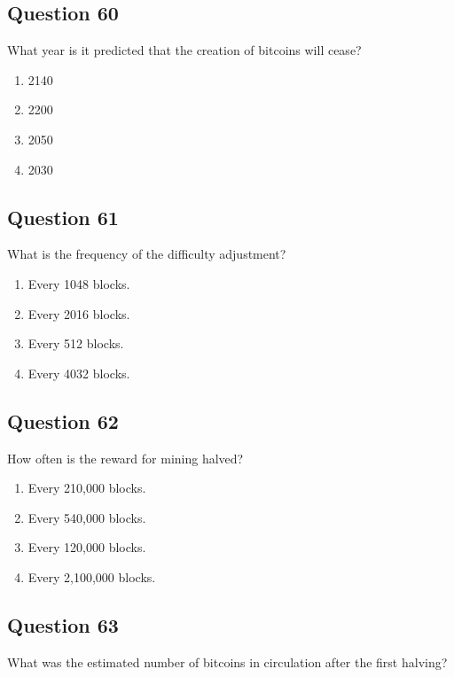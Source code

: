 \documentclass[12pt,a4paper]{article}
\begin{document}
\bigskip


\subsection*{Question 60}
What year is it predicted that the creation of bitcoins will cease?

\begin{enumerate}[label=\Alph*., leftmargin=*]
\item 2140
\item 2200
\item 2050
\item 2030
\end{enumerate}

\bigskip


\subsection*{Question 61}
What is the frequency of the difficulty adjustment?

\begin{enumerate}[label=\Alph*., leftmargin=*]
\item Every 1048 blocks.
\item Every 2016 blocks.
\item Every 512 blocks.
\item Every 4032 blocks.
\end{enumerate}

\bigskip


\subsection*{Question 62}
How often is the reward for mining halved?

\begin{enumerate}[label=\Alph*., leftmargin=*]
\item Every 210,000 blocks.
\item Every 540,000 blocks.
\item Every 120,000 blocks.
\item Every 2,100,000 blocks.
\end{enumerate}

\bigskip


\subsection*{Question 63}
What was the estimated number of bitcoins in circulation after the first halving?
\end{document}
